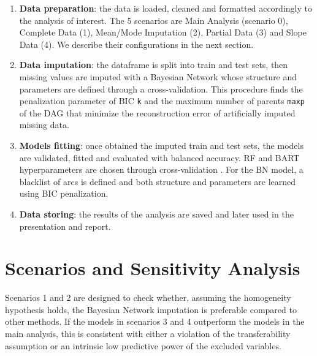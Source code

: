 \documentclass[11pt, a4paper]{article}
\begin{document}
	\begin{enumerate}
		\item \textbf{Data preparation}: the data is loaded, cleaned and formatted accordingly to the analysis of interest. The 5 scenarios are Main Analysis (scenario 0), Complete Data (1), Mean/Mode Imputation (2), Partial Data (3) and Slope Data (4). We describe their configurations in the next section.
		\item \textbf{Data imputation}: the dataframe is split into train and test sets, then missing values are imputed with a Bayesian Network whose structure and parameters are defined through a cross-validation. This procedure finds the penalization parameter of BIC \texttt{k} and the maximum number of parents \texttt{maxp} of the DAG that minimize the reconstruction error of artificially imputed missing data. 
		\item \textbf{Models fitting}: once obtained the imputed train and test sets, the models are validated, fitted and evaluated with balanced accuracy. RF and BART hyperparameters are chosen through cross-validation \cite{hastie2009elements}\cite{james2013introduction}. For the BN model, a blacklist of arcs is defined and both structure and parameters are learned using BIC penalization.
		\item \textbf{Data storing}: the results of the analysis are saved and later used in the presentation and report.
	\end{enumerate}
	
	\section{Scenarios and Sensitivity Analysis}
	Scenarios 1 and 2 are designed to check whether, assuming the homogeneity hypothesis holds, the Bayesian Network imputation is preferable compared to other methods. If the models in scenarios 3 and 4 outperform the models in the main analysis, this is consistent with either a violation of the transferability assumption or an intrinsic low predictive power of the excluded variables.
	
\end{document}
